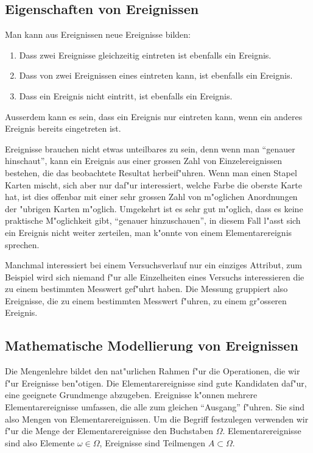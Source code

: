 \subsection{Eigenschaften von Ereignissen}
Man kann aus Ereignissen neue Ereignisse bilden:
\begin{enumerate}
\item Dass zwei Ereignisse gleichzeitig eintreten ist ebenfalls ein
Ereignis.
\item Dass von zwei Ereignissen eines eintreten kann, ist ebenfalls
ein Ereignis.
\item Dass ein Ereignis nicht eintritt, ist ebenfalls ein Ereignis.
\end{enumerate}
Ausserdem kann es sein, dass ein Ereignis nur eintreten kann, wenn ein
anderes Ereignis bereits eingetreten ist.

Ereignisse brauchen nicht etwas unteilbares
zu sein, denn wenn man ``genauer hinschaut'',
kann ein Ereignis aus einer
grossen Zahl von Einzelereignissen bestehen, die das beobachtete Resultat
herbeif"uhren. Wenn man einen Stapel Karten mischt, sich aber nur daf"ur
interessiert, welche Farbe die oberste Karte hat, ist dies offenbar mit einer
sehr grossen Zahl von m"oglichen Anordnungen der "ubrigen Karten m"oglich.
Umgekehrt ist es sehr gut m"oglich, dass es keine praktische M"oglichkeit
gibt, ``genauer hinzuschauen'', in diesem Fall l"asst sich ein Ereignis
nicht weiter zerteilen, man k"onnte von einem Elementarereignis sprechen.

Manchmal interessiert bei einem Versuchsverlauf nur ein einziges Attribut,
zum Beispiel wird sich niemand f"ur alle Einzelheiten eines Versuchs
interessieren die zu einem bestimmten Messwert gef"uhrt haben. Die Messung 
gruppiert also Ereignisse, die zu einem bestimmten Messwert f"uhren, zu
einem gr"osseren Ereignis.

\subsection{Mathematische Modellierung von Ereignissen}
Die Mengenlehre bildet den nat"urlichen Rahmen f"ur die Operationen,
die wir f"ur Ereignisse ben"otigen.
Die Elementarereignisse sind gute Kandidaten daf"ur, eine geeignete
Grundmenge abzugeben. Ereignisse
k"onnen mehrere Elementarereignisse umfassen, die alle zum gleichen
``Ausgang'' f"uhren.
Sie sind also Mengen von Elementarereignissen. Um die Begriff festzulegen
verwenden wir f"ur die Menge der Elementarereignisse den Buchstaben $\Omega$.
Elementarereignisse sind also Elemente $\omega\in\Omega$, Ereignisse sind
Teilmengen $A\subset\Omega$.

